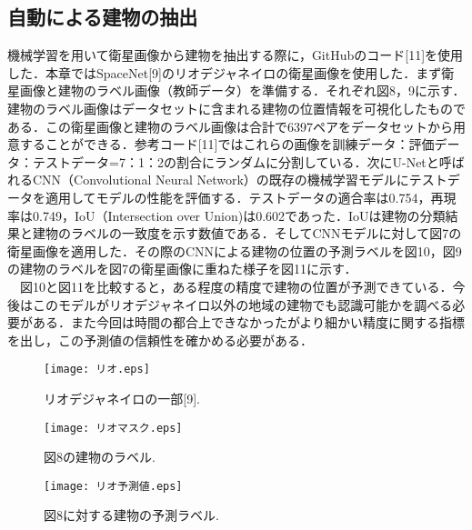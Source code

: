 \documentclass[a4j,twoside,twocolumn]{jarticle}
\begin{document}
\subsection{自動による建物の抽出}
機械学習を用いて衛星画像から建物を抽出する際に，GitHubのコード[11]を使用した．本章ではSpaceNet[9]のリオデジャネイロの衛星画像を使用した．まず衛星画像と建物のラベル画像（教師データ）を準備する．それぞれ図8，9に示す．建物のラベル画像はデータセットに含まれる建物の位置情報を可視化したものである．この衛星画像と建物のラベル画像は合計で6397ペアをデータセットから用意することができる．参考コード[11]ではこれらの画像を訓練データ：評価データ：テストデータ=7：1：2の割合にランダムに分割している．次にU-Netと呼ばれるCNN（Convolutional Neural Network）の既存の機械学習モデルにテストデータを適用してモデルの性能を評価する．テストデータの適合率は0.754，再現率は0.749，IoU（Intersection over Union)は0.602であった．IoUは建物の分類結果と建物のラベルの一致度を示す数値である．そしてCNNモデルに対して図7の衛星画像を適用した．その際のCNNによる建物の位置の予測ラベルを図10，図9の建物のラベルを図7の衛星画像に重ねた様子を図11に示す．\\
　図10と図11を比較すると，ある程度の精度で建物の位置が予測できている．今後はこのモデルがリオデジャネイロ以外の地域の建物でも認識可能かを調べる必要がある．また今回は時間の都合上できなかったがより細かい精度に関する指標を出し，この予測値の信頼性を確かめる必要がある．\\

\begin{figure}[t]
  \begin{center}
    \texttt{[image: リオ.eps]}
    \caption{リオデジャネイロの一部[9].}
    \label{fig8}
  \end{center}
\end{figure}

\begin{figure}[t]
  \begin{center}
    \texttt{[image: リオマスク.eps]}
    \caption{図8の建物のラベル.}
    \label{fig9}
  \end{center}
\end{figure}

\begin{figure}[t]
  \begin{center}
    \texttt{[image: リオ予測値.eps]}
    \caption{図8に対する建物の予測ラベル.}
    \label{fig10}
  \end{center}
\end{figure}
\end{document}
